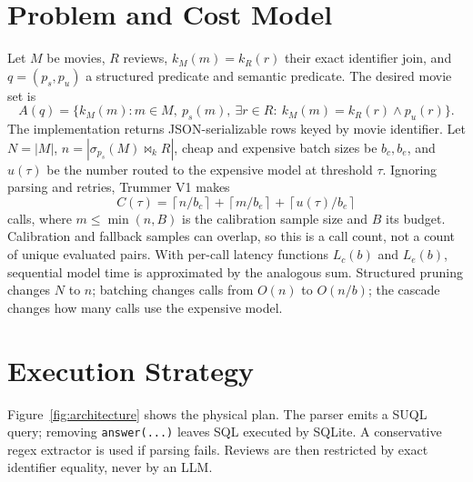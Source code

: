 \documentclass[sigconf,review]{acmart}
\begin{document}
\section{Problem and Cost Model}
Let $M$ be movies, $R$ reviews, $k_M(m)=k_R(r)$ their exact identifier join, and
$q=(p_s,p_u)$ a structured predicate and semantic predicate. The desired movie
set is
\begin{equation}
 A(q)=\{k_M(m):m\in M,\ p_s(m),\ \exists r\in R:\ k_M(m)=k_R(r)\land p_u(r)\}.
\end{equation}
The implementation returns JSON-serializable rows keyed by movie identifier.
Let $N=|M|$, $n=|\sigma_{p_s}(M)\Join_k R|$, cheap and expensive batch sizes be
$b_c,b_e$, and $u(\tau)$ be the number routed to the expensive model at threshold
$\tau$. Ignoring parsing and retries, Trummer V1 makes
\begin{equation}
 C(\tau)=\left\lceil n/b_c\right\rceil+
 \left\lceil m/b_e\right\rceil+\left\lceil u(\tau)/b_e\right\rceil
\end{equation}
calls, where $m\leq\min(n,B)$ is the calibration sample size and $B$ its budget.
Calibration and fallback samples can overlap, so this is a call count, not a
count of unique evaluated pairs. With per-call latency functions $L_c(b)$ and
$L_e(b)$, sequential model time is approximated by the analogous sum. Structured
pruning changes $N$ to $n$; batching changes calls from $O(n)$ to $O(n/b)$; the
cascade changes how many calls use the expensive model.

\section{Execution Strategy}
Figure~\ref{fig:architecture} shows the physical plan. The parser emits a SUQL
query; removing \texttt{answer(...)} leaves SQL executed by SQLite. A conservative
regex extractor is used if parsing fails. Reviews are then restricted by exact
identifier equality, never by an LLM.
\end{document}
